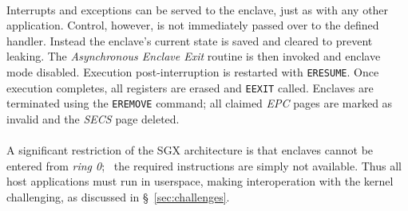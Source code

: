 \paragraph{} Interrupts and exceptions can be served to the enclave, just as with any other application. Control, however, is not immediately passed over to the defined handler. Instead the enclave's current state is saved and cleared to prevent leaking. The \textit{Asynchronous Enclave Exit} routine is then invoked and enclave mode disabled. Execution post-interruption is restarted with \texttt{ERESUME}. Once execution completes, all registers are erased and \texttt{EEXIT} called. Enclaves are terminated using the \texttt{EREMOVE} command; all claimed \textit{EPC} pages are marked as invalid and the \textit{SECS} page deleted.

\paragraph{} \label{sec:sgx-no-kernel-mode} A significant restriction of the SGX architecture is that enclaves cannot be entered from \textit{ring 0};~\cite{sgx-prog-reference} the required instructions are simply not available. Thus all host applications must run in userspace, making interoperation with the kernel challenging, as discussed in §~\ref{sec:challenges}.

